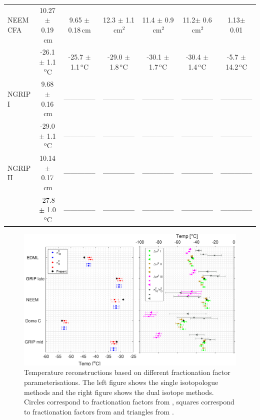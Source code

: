 \documentclass[11pt, draftcls, onecolumn]{IEEEtran} %
\numberwithin{equation}{section}
\numberwithin{table}{section}
\numberwithin{figure}{section}
\begin{document}
\begin{table}[]
\begin{tabular}{l c c c c c c}
		NEEM CFA&10.27 $\pm$ 0.19$\,\mathrm{cm}$& 9.65 $\pm$ 0.18$\,\mathrm{cm}$& 12.3 $\pm$ 1.1$\,\mathrm{cm}^2$& 11.4 $\pm$ 0.9$\,\mathrm{cm}^2$& 11.2$\pm$ 0.6$\,\mathrm{cm}^2$& 1.13$\pm$ 0.01\\
		& -26.1 $\pm$ 1.1$\,^\mathrm{o}$C & -25.7 $\pm$ 1.1$\,^\mathrm{o}$C& -29.0 $\pm$ 1.8$\,^\mathrm{o}$C& -30.1 $\pm$ 1.7$\,^\mathrm{o}$C& -30.4 $\pm$ 1.4$\,^\mathrm{o}$C & -5.7 $\pm$ 14.2$\,^\mathrm{o}$C\\
		
		NGRIP I&9.68 $\pm$ 0.16$\,\mathrm{cm}$& --------------&--------------& --------------&--------------&--------------\\
		& -29.0 $\pm$ 1.1$\,^\mathrm{o}$C & --------------&--------------&-------------- &--------------& --------------\\
		
		NGRIP II &10.14 $\pm$ 0.17$\,\mathrm{cm}$&-------------- &--------------&--------------&-------------- & --------------\\
		& -27.8 $\pm$ 1.0$\,^\mathrm{o}$C & --------------&-------------- &-------------- &-------------- &--------------\\
		\bottomrule	
	\end{tabular}
\end{table}



\begin{figure}[]
	\vspace*{2mm}
	\begin{center}
		\includegraphics[width=\textwidth]{Figure_13}
		\caption{Temperature reconstructions based on
			different fractionation factor parameterisations.
			The left figure shows the single isotopologue methods and 
			the right figure shows the dual isotope methods.
			Circles correspond to fractionation factors from \citet{Majoube1971,Merlivat1967}, 
			squares correspond to fractionation factors from \citet{Ellehoj2013} and  triangles from \citet{Lamb2015,Majoube1971}. }  
		\label{fig:fractionation_temps}
	\end{center}
\end{figure}
\end{document}
